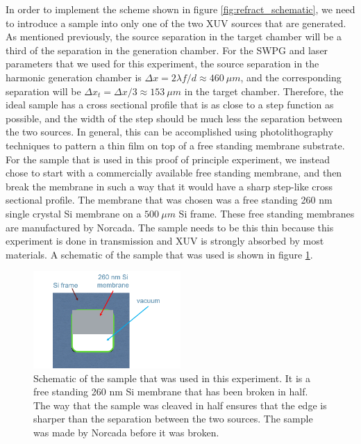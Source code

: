 In order to implement the scheme shown in figure \ref{fig:refract_schematic}, we need to introduce a sample into only one of the two XUV sources that are generated.  As mentioned previously, the source separation in the target chamber will be a third of the separation in the generation chamber. For the SWPG and laser parameters that we used for this experiment, the source separation in the harmonic generation chamber is $\Delta x=2\lambda f/d\approx460\:\mu m$, and the corresponding separation will be $\Delta x_t = \Delta x/3\approx153\: \mu m$ in the target chamber.  Therefore, the ideal sample has a cross sectional profile that is as close to a step function as possible, and the width of the step should be much less the separation between the two sources.  In general, this can be accomplished using photolithography techniques to pattern a thin film on top of a free standing membrane substrate.  For the sample that is used in this proof of principle experiment, we instead chose to start with a commercially available free standing membrane, and then break the membrane in such a way that it would have a sharp step-like cross sectional profile.  The membrane that was chosen was a free standing 260 nm single crystal Si membrane on a $500\:\mu m$ Si frame.  These free standing membranes are manufactured by Norcada.  The sample needs to be this thin because this experiment is done in transmission and XUV is strongly absorbed by most materials. A schematic of the sample that was used is shown in figure \ref{fig:split_sample}.
\begin{figure}
	\centering
	\includegraphics[width=0.5\textwidth]{figures/refractive_index/broken_sample.png}
	\caption{Schematic of the sample that was used in this experiment.  It is a free standing 260 nm Si membrane that has been broken in half.  The way that the sample was cleaved in half ensures that the edge is sharper than the separation between the two sources.  The sample was made by Norcada before it was broken.}
	\label{fig:split_sample}
\end{figure}

